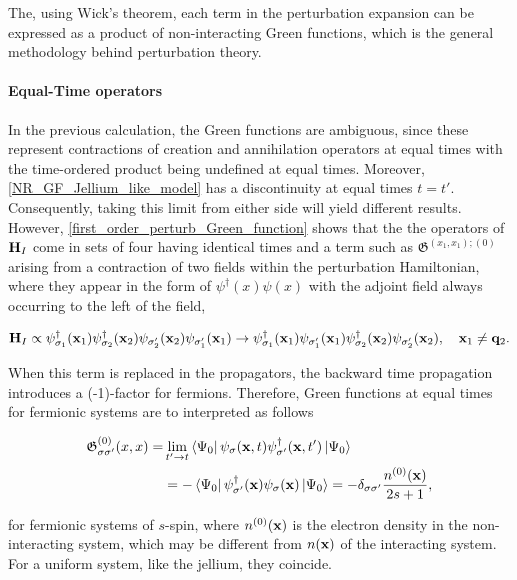\documentclass{homework}
\begin{document}
The, using Wick's theorem, each term in the perturbation expansion can be expressed as a product of non-interacting Green functions, which is the general methodology behind perturbation theory. \\

\paragraph{Equal-Time operators}

In the previous calculation, the Green functions are ambiguous, since these represent contractions of creation and annihilation operators at equal times with the time-ordered product being undefined at equal times. Moreover, \cref{NR_GF_Jellium_like_model} has a discontinuity at equal times $t=t'$. Consequently, taking this limit from either side will yield different results. However, \cref{first_order_perturb_Green_function} shows that the the operators of ${\bf H}_I$ come in sets of four having identical times and a term such as ${\mathfrak{G}^{(x_1, x_1);(0)}}$ arising from a contraction of two fields within the perturbation Hamiltonian, where they appear in the form of $\psi^\dagger(x)\psi(x)$ with the adjoint field always occurring to the left of the field, 

$$
    {\bf H}_I \propto \psi_{\sigma_1}^\dagger ({\bf x}_1) \psi_{\sigma_2}^\dagger ({\bf x}_2) \psi_{\sigma'_2} ({\bf x}_2) \psi_{\sigma'_1} ({\bf x}_1) \rightarrow 
    \psi_{\sigma_1}^\dagger ({\bf x}_1)  \psi_{\sigma'_1} ({\bf x}_1) \psi_{\sigma_2}^\dagger ({\bf x}_2) \psi_{\sigma'_2} ({\bf x}_2), \quad {\bf x}_1 \neq {\bf q}_2.
$$

When this term is replaced in the propagators, the backward time propagation introduces a (-1)-factor for fermions. Therefore, Green functions at equal times for fermionic systems are to interpreted as follows

\begin{equation}
    \begin{split}
        \mathfrak{G}_{\sigma \sigma'}^{(0)}(x,x) =& \lim_{t' \rightarrow t} \bra{\Psi_0} \psi_{\sigma}({\bf x}, t)  \psi^\dagger_{\sigma'}({\bf x}, t') \ket{\Psi_0} \\
        &= - \bra{\Psi_0} \psi^\dagger_{\sigma'}({\bf x}) \psi_{\sigma}({\bf x}) \ket{\Psi_0} = - \delta_{\sigma \sigma'} \frac{n^{(0)}({\bf x)}}{2s+1},
    \end{split}
\end{equation}

for fermionic systems of $s$-spin, where $n^{(0)}({\bf x})$ is the electron density in the non-interacting system, which may be different from $n({\bf x})$ of the interacting system. For a uniform system, like the jellium, they coincide. \\
\end{document}

